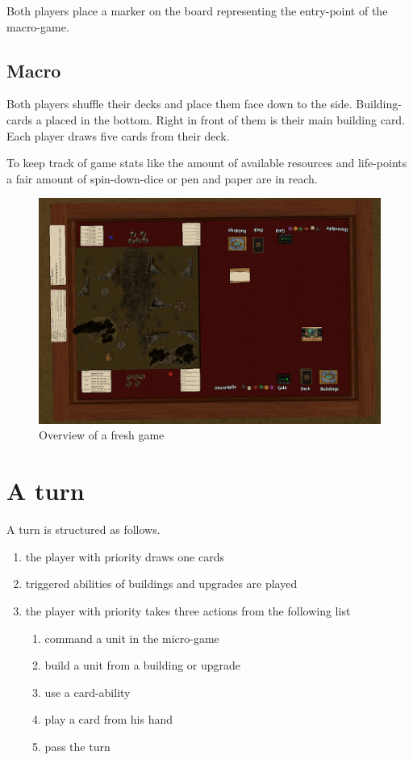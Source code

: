 \documentclass[a5paper,pagesize,10pt,bibtotoc,pointlessnumbers,
normalheadings,DIV=9,twoside=false]{scrbook}
\begin{document}
Both players place a marker on the board representing the entry-point of the macro-game.

\subsection{Macro}
Both players shuffle their decks and place them face down to the side. Building-cards a placed in the bottom. Right in front of them is their main building card. Each player draws five cards from their deck.

To keep track of game stats like the amount of available resources and life-points a fair amount of spin-down-dice or pen and paper are in reach.

\begin{figure}[t]
\includegraphics[scale=0.325]{Boardoverview}
\centering
\caption{Overview of a fresh game}
\end{figure}

\section{A turn}
A turn is structured as follows.

\begin{enumerate}
\item the player with priority draws one cards
\item triggered abilities of buildings and upgrades are played
\item the player with priority takes three actions from the following list
\begin{enumerate}
\item command a unit in the micro-game
\item build a unit from a building or upgrade
\item use a card-ability
\item play a card from his hand
\item pass the turn
\end{enumerate}
\end{enumerate}
\end{document}
